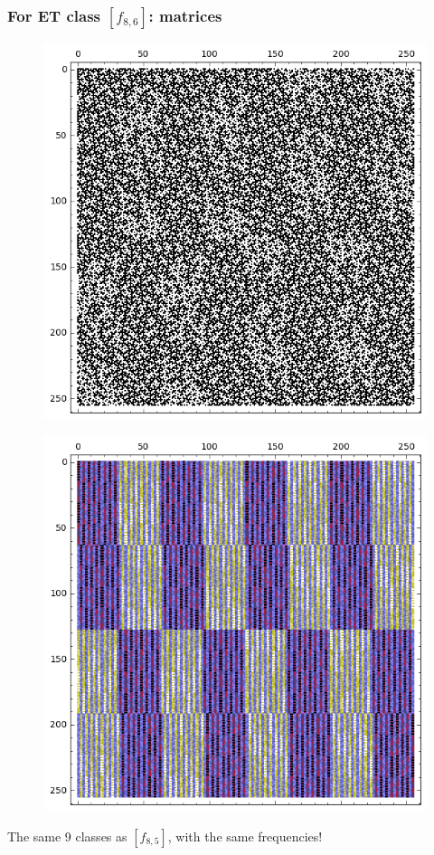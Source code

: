 \documentclass[pdf,sprung,slideColor,nocolorBG]{beamer}
\begin{document}
\begin{frame}
\frametitle{For ET class $[f_{8,6}]$: matrices}
\begin{figure}
\centering
\begin{minipage}{.48\textwidth}
  \centering
  \includegraphics[width=.9\linewidth]{../matrix_plot/c8_6_weight_class_matrix.png}
  \label{fig:8_6_weight_class_matrix}
\end{minipage}%
\begin{minipage}{.48\textwidth}
  \centering
  \includegraphics[width=.9\linewidth]{../matrix_plot/c8_6_bent_cayley_graph_index_matrix.png}
  \label{fig:8_6_bent_cayley_graph_index_matrix}
\end{minipage}
\end{figure}
The same 9 classes as $[f_{8,5}]$, with the same frequencies!
\end{frame}
\end{document}
